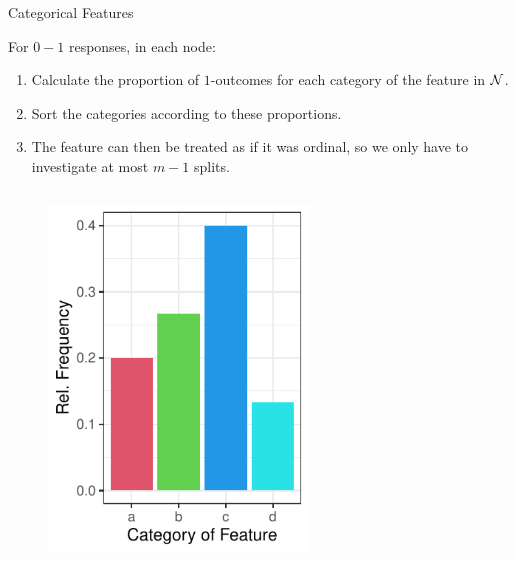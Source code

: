 \documentclass[11pt,compress,t,notes=noshow, xcolor=table]{beamer}
\begin{document}
  \begin{frame}[noframenumbering]{Categorical Features}

For $0-1$ responses, in each node:
  \begin{enumerate}
  \item Calculate the proportion of $1$-outcomes for each category of the feature in $\mathcal{N}$.
  \item Sort the categories according to these proportions.
  \item The feature can then be treated as if it was ordinal, so we only have to investigate at most $m-1$ splits.
  \end{enumerate}
  \begin{columns}
  \begin{column}{0.33\textwidth}
  \begin{figure}
  \includegraphics[width=0.8\textwidth]{figure/categoryplot-binary1.pdf} 
  \end{figure}
  \end{column}
  \begin{column}{0.33\textwidth}
  \begin{figure}

\end{figure}
\end{column}
\end{columns}
\end{frame}
\end{document}
